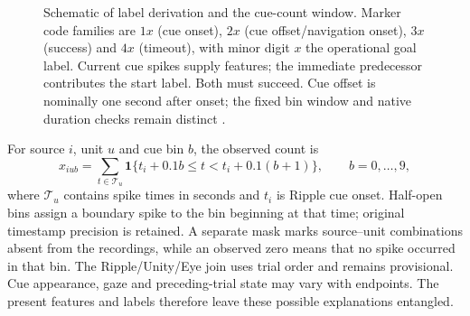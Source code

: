 \documentclass[10pt,a4paper]{article}
\begin{document}
\begin{figure}[h!]
\centering
{}
\caption{Schematic of label derivation and the cue-count window. Marker code families are $1x$ (cue onset), $2x$ (cue offset/navigation onset), $3x$ (success) and $4x$ (timeout), with minor digit $x$ the operational goal label. Current cue spikes supply features; the immediate predecessor contributes the start label. Both must succeed. Cue offset is nominally one second after onset; the fixed bin window and native duration checks remain distinct \cite{contract,compact,latest}.}
\label{fig:measurement}
\end{figure}

For source $i$, unit $u$ and cue bin $b$, the observed count is
\begin{equation}
 x_{iub}=\sum_{t\in\mathcal T_u}\mathbf 1\{t_i+0.1b\leq t<t_i+0.1(b+1)\},\qquad b=0,\ldots,9,
\label{eq:count}
\end{equation}
where $\mathcal T_u$ contains spike times in seconds and $t_i$ is Ripple cue onset. Half-open bins assign a boundary spike to the bin beginning at that time; original timestamp precision is retained. A separate mask marks source--unit combinations absent from the recordings, while an observed zero means that no spike occurred in that bin. The Ripple/Unity/Eye join uses trial order and remains provisional. Cue appearance, gaze and preceding-trial state may vary with endpoints. The present features and labels therefore leave these possible explanations entangled.
\end{document}
